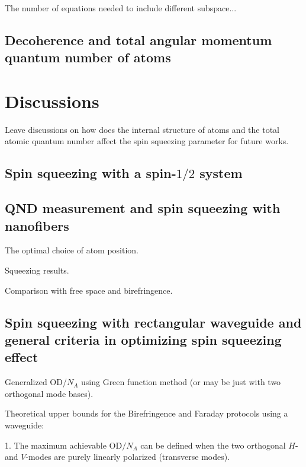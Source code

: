 \documentclass[pra,twocolumn,floatfix,superscriptaddress]{revtex4-1} %
\newcommand{\comment}[1]{{\color{Maroon} #1}}
\begin{document}
The number of equations needed to include different subspace...

\subsection{Decoherence and total angular momentum quantum number of atoms}

\section{Discussions} \label{Sec::Discussions}
\comment{Leave discussions on how does the internal structure of atoms and the total atomic quantum number affect the spin squeezing parameter for future works.}


\subsection{Spin squeezing with a spin-$1/2$ system} \label{Sec::squeezingwithspinhalfsystems}


\subsection{QND measurement and spin squeezing with nanofibers} \label{Sec::Nanofiber}

The optimal choice of atom position.

Squeezing results.

Comparison with free space and birefringence.


\subsection{Spin squeezing with rectangular waveguide and general criteria in optimizing spin squeezing effect} \label{Sec::Waveguide}

Generalized OD/$N_A$ using Green function method (or may be just with two orthogonal mode bases).

Theoretical upper bounds for the Birefringence and Faraday protocols using a waveguide:

1. The maximum achievable OD$ /N_A $ can be defined when the two orthogonal $ H $- and $ V $-modes are purely linearly polarized (transverse modes).
\end{document}
